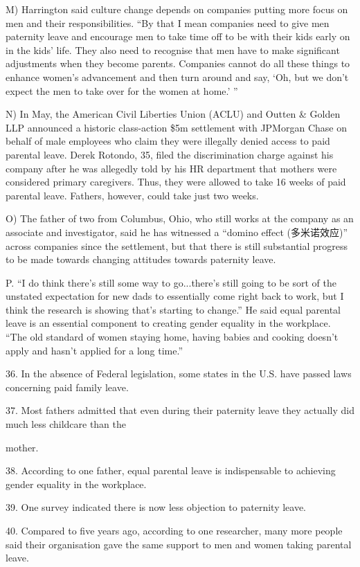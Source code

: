 \documentclass[UTF8,11pt]{ctexart}
\begin{document}
M) Harrington said culture change depends on companies putting more focus on men and their responsibilities. “By that I mean companies need to give men paternity leave and encourage men to take time off to be with their kids early on in the kids’ life. They also need to recognise that men have to make significant adjustments when they become parents. Companies cannot do all these things to enhance women’s advancement and then turn around and say, ‘Oh, but we don’t expect the men to take over for the women at home.’ ”


N) In May, the American Civil Liberties Union (ACLU) and Outten \& Golden LLP announced a historic class-action \$5m settlement with JPMorgan Chase on behalf of male employees who claim they were illegally denied access to paid parental leave. Derek Rotondo, 35, filed the discrimination charge against his company after he was allegedly told by his HR department that mothers were considered primary caregivers. Thus, they were allowed to take 16 weeks of paid parental leave. Fathers, however, could take just two weeks.


O) The father of two from Columbus, Ohio, who still works at the company as an associate and investigator, said he has witnessed a “domino effect (多米诺效应)” across companies since the settlement, but that there is still substantial progress to be made towards changing attitudes towards paternity leave.


P. “I do think there’s still some way to go...there’s still going to be sort of the unstated expectation for new dads to essentially come right back to work, but I think the research is showing that’s starting to change.” He said equal parental leave is an essential component to creating gender equality in the workplace. “The old standard of women staying home, having babies and cooking doesn’t apply and hasn’t applied for a long time.”


36. In the absence of Federal legislation, some states in the U.S. have passed laws concerning paid family leave.


37. Most fathers admitted that even during their paternity leave they actually did much less childcare than the


mother.


38. According to one father, equal parental leave is indispensable to achieving gender equality in the workplace.


39. One survey indicated there is now less objection to paternity leave.


40. Compared to five years ago, according to one researcher, many more people said their organisation gave the same support to men and women taking parental leave.
\end{document}
